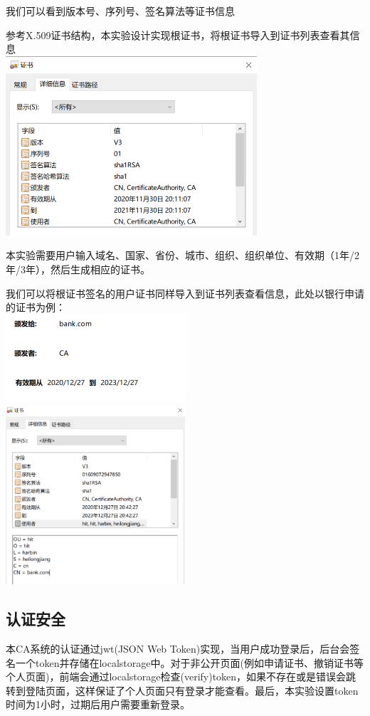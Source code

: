 \documentclass{ctexart}
\begin{document}
我们可以看到版本号、序列号、签名算法等证书信息

参考X.509证书结构，本实验设计实现根证书，将根证书导入到证书列表查看其信息\\

\includegraphics[width=0.7\textwidth]{Clipboard_2021-01-01-16-32-53.png}


本实验需要用户输入域名、国家、省份、城市、组织、组织单位、有效期（1年/2年/3年），然后生成相应的证书。

我们可以将根证书签名的用户证书同样导入到证书列表查看信息，此处以银行申请的证书为例：\\

\includegraphics[width=0.5\textwidth]{Clipboard_2021-01-01-16-34-37.png}
\includegraphics[width=0.5\textwidth]{Clipboard_2021-01-01-16-35-35.png}
\subsection{认证安全}
本CA系统的认证通过jwt(JSON Web Token)实现，当用户成功登录后，后台会签名一个token并存储在localstorage中。对于非公开页面(例如申请证书、撤销证书等个人页面)，前端会通过localstorage检查(verify)token，如果不存在或是错误会跳转到登陆页面，这样保证了个人页面只有登录才能查看。最后，本实验设置token时间为1小时，过期后用户需要重新登录。\\
\end{document}
